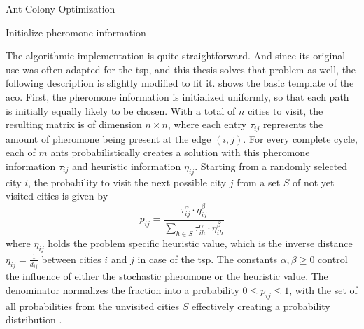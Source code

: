 \begin{algorithm}
	\caption{Ant Colony Optimization}
	\label{alg:aco}
	
	\begin{algorithmic}
		\State Initialize pheromone information
		\Repeat
		\State {}
		\EndFor
		\State {}
		\State {}
		\EndProcedure
	\end{algorithmic}
\end{algorithm}

The algorithmic implementation is quite straightforward. And since its original use was often adapted for the \gls{tsp}, and this thesis solves that problem as well, the following description is slightly modified to fit it.
 shows the basic template of the \gls{aco}. First, the pheromone information is initialized uniformly, so that each path is initially equally likely to be chosen. With a total of $n$ cities to visit, the resulting matrix is of dimension $n \times n$, where each entry $\tau_{ij}$ represents the amount of pheromone being present at the edge $(i,j)$.
For every complete cycle, each of $m$ ants probabilistically creates a solution with this pheromone information $\tau_{ij}$ and heuristic information $\eta_{ij}$. Starting from a randomly selected city $i$, the probability to visit the next possible city $j$ from a set $S$ of not yet visited cities is given by 
\begin{equation}
		\label{eq:aco_prob}
		p_{ij} = \frac{\tau_{ij}^\alpha \cdot \eta_{ij}^\beta}{\sum_{h \in S} \tau_{ih}^\alpha \cdot \eta_{ih}^\beta}
\end{equation}
where $\eta_{ij}$ holds the problem specific heuristic value, which is the inverse distance $\eta_{ij} = \frac{1}{d_{ij}}$ between cities $i$ and $j$ in case of the \gls{tsp}. The constants $\alpha, \beta \geq 0$ control the influence of either the stochastic pheromone or the heuristic value. The denominator normalizes the fraction into a probability $0 \leq p_{ij} \leq 1$, with the set of all probabilities from the unvisited cities $S$ effectively creating a probability distribution \cite{talbi2009metaheuristics}.

